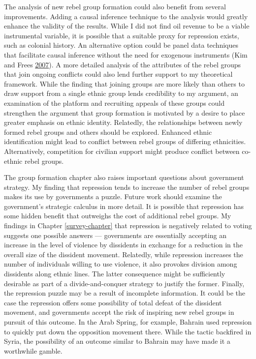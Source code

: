 \documentclass[12pt,]{book}
\theoremstyle{definition}
\theoremstyle{definition}
\theoremstyle{remark}
\begin{document}
The analysis of new rebel group formation could also benefit from
several improvements. Adding a causal inference technique to the
analysis would greatly enhance the validity of the results. While I did
not find oil revenue to be a viable instrumental variable, it is
possible that a suitable proxy for repression exists, such as colonial
history. An alternative option could be panel data techniques that
facilitate causal inference without the need for exogenous instruments
(Kim and Frees \protect\hyperlink{ref-Kim2007}{2007}). A more detailed
analysis of the attributes of the rebel groups that join ongoing
conflicts could also lend further support to my theoretical framework.
While the finding that joining groups are more likely than others to
draw support from a single ethnic group lends credibility to my
argument, an examination of the platform and recruiting appeals of these
groups could strengthen the argument that group formation is motivated
by a desire to place greater emphasis on ethnic identity. Relatedly, the
relationships between newly formed rebel groups and others should be
explored. Enhanced ethnic identification might lead to conflict between
rebel groups of differing ethnicities. Alternatively, competition for
civilian support might produce conflict between co-ethnic rebel groups.

The group formation chapter also raises important questions about
government strategy. My finding that repression tends to increase the
number of rebel groups makes its use by governments a puzzle. Future
work should examine the government's strategic calculus in more detail.
It is possible that repression has some hidden benefit that outweighs
the cost of additional rebel groups. My findings in Chapter
\ref{survey-chapter} that repression is negatively related to voting
suggests one possible answers --- governments are essentially accepting
an increase in the level of violence by dissidents in exchange for a
reduction in the overall size of the dissident movement. Relatedly,
while repression increases the number of individuals willing to use
violence, it also provokes division among dissidents along ethnic lines.
The latter consequence might be sufficiently desirable as part of a
divide-and-conquer strategy to justify the former. Finally, the
repression puzzle may be a result of incomplete information. It could be
the case the repression offers some possibility of total defeat of the
dissident movement, and governments accept the risk of inspiring new
rebel groups in pursuit of this outcome. In the Arab Spring, for
example, Bahrain used repression to quickly put down the opposition
movement there. While the tactic backfired in Syria, the possibility of
an outcome similar to Bahrain may have made it a worthwhile gamble.
\end{document}
